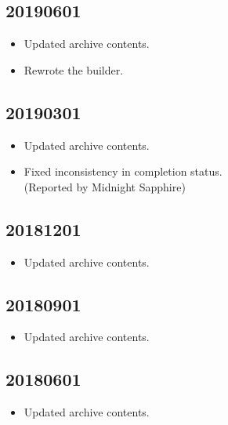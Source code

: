 \documentclass[hidelinks,a4paper,12pt]{article}
\begin{document}
\subsection{20190601}  \label{sec:changelog_20190601}

\begin{itemize}
\item Updated archive contents.
\item Rewrote the builder.
\end{itemize}

\subsection{20190301}  \label{sec:changelog_20190301}

\begin{itemize}
\item Updated archive contents.
\item Fixed inconsistency in completion status.
  \\ (Reported by Midnight Sapphire)
\end{itemize}

\subsection{20181201}  \label{sec:changelog_20181201}

\begin{itemize}
\item Updated archive contents.
\end{itemize}

\subsection{20180901}  \label{sec:changelog_20180901}

\begin{itemize}
\item Updated archive contents.
\end{itemize}

\subsection{20180601}  \label{sec:changelog_20180601}

\begin{itemize}
\item Updated archive contents.
\end{itemize}
\end{document}
